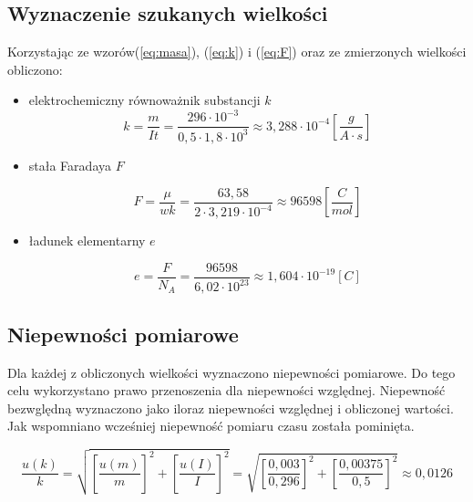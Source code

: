 \documentclass [a4paper,11pt]{article}
\begin{document}
	\subsection{Wyznaczenie szukanych wielkości}
		Korzystając ze wzorów(\ref{eq:masa}), (\ref{eq:k}) i (\ref{eq:F}) oraz ze zmierzonych wielkości obliczono:
	\begin{itemize}
		
		\item elektrochemiczny równoważnik substancji $k$
		\begin{equation}
		k = \frac{m}{I t} = \frac{296 \cdot 10^{-3}}{0,5 \cdot 1,8 \cdot 10^3} \approx 3,288\cdot 10^{-4} \left[  \frac{g}{A \cdot s}\right] 
		\label{k_obliczone} 
		\end{equation}
		
		\item stała Faradaya $F$
		
		\begin{equation}
		F = \frac{\mu}{w k} = \frac{63,58 }{2 \cdot 3,219 \cdot 10^{-4}} \approx 96598  \left[  \frac{C}{mol}\right] 
		\label{F_obliczone} 
		\end{equation}
		
		\item ładunek elementarny $e$
		
		\begin{equation}
		e = \frac{F}{N_A} = \frac{96598 }{6,02 \cdot 10^{23}} \approx 1,604 \cdot 10^{-19}   \left[  C \right] 
		\label{e_obliczone} 
		\end{equation}
	\end{itemize}
 
 	
 	\subsection{Niepewności pomiarowe }
 	

 	Dla każdej z obliczonych wielkości wyznaczono niepewności pomiarowe. Do tego celu wykorzystano prawo przenoszenia dla niepewności względnej. Niepewność bezwględną wyznaczono jako iloraz niepewności względnej i obliczonej wartości.
 	Jak wspomniano wcześniej niepewność pomiaru czasu została pominięta.

 	\begin{equation}
 	\frac{u(k)}{k} = \sqrt{\left[\frac{u(m)}{m} \right]^2 + \left[\frac{u(I)}{I} \right]^2 } = \sqrt{\left[\frac{ 0,003}{0,296} \right]^2 + \left[\frac{0,00375}{0,5} \right]^2 } \approx 0,0126
 	\end{equation}
 	
\end{document}
